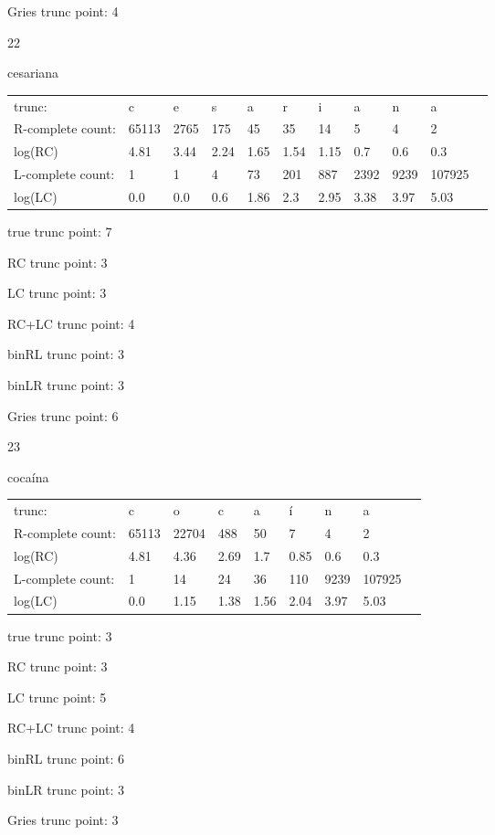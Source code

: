 \documentclass[10pt]{article}
\begin{document}
Gries trunc point: 4

\vspace{1em}

22

cesariana

\begin{tabular}{l|llllllllll}
trunc: & c & e & s & a & r & i & a & n & a & \\ 
R-complete count: & 65113 & 2765 & 175 & 45 & 35 & 14 & 5 & 4 & 2 & \\ 
log(RC) & 4.81 & 3.44 & 2.24 & 1.65 & 1.54 & 1.15 & 0.7 & 0.6 & 0.3 & \\ 
L-complete count: & 1 & 1 & 4 & 73 & 201 & 887 & 2392 & 9239 & 107925 & \\ 
log(LC) & 0.0 & 0.0 & 0.6 & 1.86 & 2.3 & 2.95 & 3.38 & 3.97 & 5.03 & \\ 
\end{tabular}

true trunc point: 7

RC trunc point: 3

LC trunc point: 3

RC+LC trunc point: 4

binRL trunc point: 3

binLR trunc point: 3

Gries trunc point: 6

\vspace{1em}

23

cocaína

\begin{tabular}{l|llllllll}
trunc: & c & o & c & a & í & n & a & \\ 
R-complete count: & 65113 & 22704 & 488 & 50 & 7 & 4 & 2 & \\ 
log(RC) & 4.81 & 4.36 & 2.69 & 1.7 & 0.85 & 0.6 & 0.3 & \\ 
L-complete count: & 1 & 14 & 24 & 36 & 110 & 9239 & 107925 & \\ 
log(LC) & 0.0 & 1.15 & 1.38 & 1.56 & 2.04 & 3.97 & 5.03 & \\ 
\end{tabular}

true trunc point: 3

RC trunc point: 3

LC trunc point: 5

RC+LC trunc point: 4

binRL trunc point: 6

binLR trunc point: 3

Gries trunc point: 3
\end{document}
